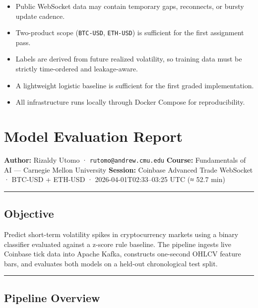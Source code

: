 \documentclass[
]{article}
\providecommand{\tightlist}{%
  \setlength{\itemsep}{0pt}\setlength{\parskip}{0pt}}
\begin{document}
\begin{itemize}
\tightlist
\item
  Public WebSocket data may contain temporary gaps, reconnects, or
  bursty update cadence.
\item
  Two-product scope (\texttt{BTC-USD}, \texttt{ETH-USD}) is sufficient
  for the first assignment pass.
\item
  Labels are derived from future realized volatility, so training data
  must be strictly time-ordered and leakage-aware.
\item
  A lightweight logistic baseline is sufficient for the first graded
  implementation.
\item
  All infrastructure runs locally through Docker Compose for
  reproducibility.
\end{itemize}

\clearpage

\hypertarget{model-evaluation-report}{%
\section{Model Evaluation Report}\label{model-evaluation-report}}

\textbf{Author:} Rizaldy Utomo · \texttt{rutomo@andrew.cmu.edu}
\textbf{Course:} Fundamentals of AI --- Carnegie Mellon University
\textbf{Session:} Coinbase Advanced Trade WebSocket · BTC-USD + ETH-USD
· 2026-04-01T02:33--03:25 UTC (≈ 52.7 min)

\begin{center}\rule{0.5\linewidth}{0.5pt}\end{center}

\hypertarget{objective}{%
\subsection{Objective}\label{objective}}

Predict short-term volatility spikes in cryptocurrency markets using a
binary classifier evaluated against a z-score rule baseline. The
pipeline ingests live Coinbase tick data into Apache Kafka, constructs
one-second OHLCV feature bars, and evaluates both models on a held-out
chronological test split.

\begin{center}\rule{0.5\linewidth}{0.5pt}\end{center}

\hypertarget{pipeline-overview}{%
\subsection{Pipeline Overview}\label{pipeline-overview}}
\end{document}
